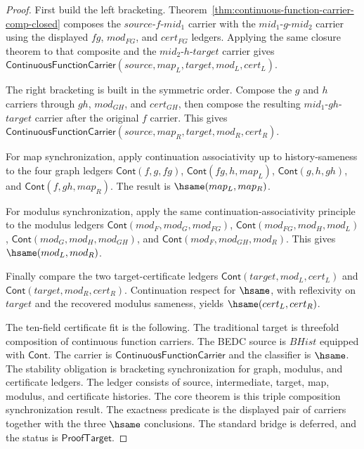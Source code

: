 \begin{proof}
First build the left bracketing. Theorem~\ref{thm:continuous-function-carrier-comp-closed}
composes the $source$-$f$-$mid_1$ carrier with the $mid_1$-$g$-$mid_2$
carrier using the displayed $fg$, $mod_{FG}$, and $cert_{FG}$ ledgers. Applying
the same closure theorem to that composite and the $mid_2$-$h$-$target$
carrier gives
$\mathsf{ContinuousFunctionCarrier}(source,map_L,target,mod_L,cert_L)$.

The right bracketing is built in the symmetric order. Compose the $g$ and $h$
carriers through $gh$, $mod_{GH}$, and $cert_{GH}$, then compose the resulting
$mid_1$-$gh$-$target$ carrier after the original $f$ carrier. This gives
$\mathsf{ContinuousFunctionCarrier}(source,map_R,target,mod_R,cert_R)$.

For map synchronization, apply continuation associativity up to
history-sameness to the four graph ledgers
$\mathsf{Cont}(f,g,fg)$, $\mathsf{Cont}(fg,h,map_L)$,
$\mathsf{Cont}(g,h,gh)$, and $\mathsf{Cont}(f,gh,map_R)$. The result is
$\hsame(map_L,map_R)$.

For modulus synchronization, apply the same continuation-associativity
principle to the modulus ledgers
$\mathsf{Cont}(mod_F,mod_G,mod_{FG})$,
$\mathsf{Cont}(mod_{FG},mod_H,mod_L)$,
$\mathsf{Cont}(mod_G,mod_H,mod_{GH})$, and
$\mathsf{Cont}(mod_F,mod_{GH},mod_R)$. This gives
$\hsame(mod_L,mod_R)$.

Finally compare the two target-certificate ledgers
$\mathsf{Cont}(target,mod_L,cert_L)$ and
$\mathsf{Cont}(target,mod_R,cert_R)$. Continuation respect for $\hsame$, with
reflexivity on $target$ and the recovered modulus sameness, yields
$\hsame(cert_L,cert_R)$.

The ten-field certificate fit is the following. The traditional target is
threefold composition of continuous function carriers. The BEDC source is
$BHist$ equipped with $\mathsf{Cont}$. The carrier is
$\mathsf{ContinuousFunctionCarrier}$ and the classifier is $\hsame$. The
stability obligation is bracketing synchronization for graph, modulus, and
certificate ledgers. The ledger consists of source, intermediate, target, map,
modulus, and certificate histories. The core theorem is this triple
composition synchronization result. The exactness predicate is the displayed
pair of carriers together with the three $\hsame$ conclusions. The standard
bridge is deferred, and the status is $\mathsf{ProofTarget}$.
\end{proof}








